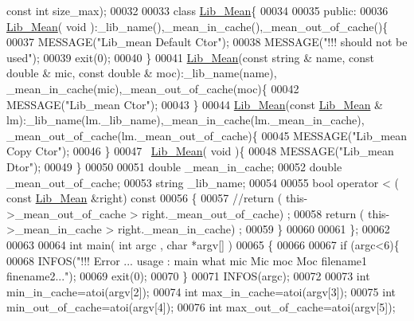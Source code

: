 \begin{DoxyCode}
{      const} \textcolor{keywordtype}{int} size\_max);
00032 
00033 \textcolor{keyword}{class }\hyperlink{class_lib___mean}{Lib\_Mean}\{
00034 
00035 \textcolor{keyword}{public}:
00036   \hyperlink{class_lib___mean}{Lib\_Mean}( \textcolor{keywordtype}{void} ):\_lib\_name(),\_mean\_in\_cache(),\_mean\_out\_of\_cache()\{
00037     MESSAGE(\textcolor{stringliteral}{"Lib\_mean Default Ctor"});
00038     MESSAGE(\textcolor{stringliteral}{"!!! should not be used"});
00039     exit(0);
00040   \}
00041   \hyperlink{class_lib___mean}{Lib\_Mean}(\textcolor{keyword}{const} \textcolor{keywordtype}{string} & name, \textcolor{keyword}{const} \textcolor{keywordtype}{double} & mic, \textcolor{keyword}{const} \textcolor{keywordtype}{double} & moc):\_lib\_name(name),
      \_mean\_in\_cache(mic),\_mean\_out\_of\_cache(moc)\{
00042     MESSAGE(\textcolor{stringliteral}{"Lib\_mean Ctor"});
00043   \}
00044   \hyperlink{class_lib___mean}{Lib\_Mean}(\textcolor{keyword}{const} \hyperlink{class_lib___mean}{Lib\_Mean} & lm):\_lib\_name(lm.\_lib\_name),\_mean\_in\_cache(lm.\_mean\_in\_cache),
      \_mean\_out\_of\_cache(lm.\_mean\_out\_of\_cache)\{
00045     MESSAGE(\textcolor{stringliteral}{"Lib\_mean Copy Ctor"});
00046   \}
00047   ~\hyperlink{class_lib___mean}{Lib\_Mean}( \textcolor{keywordtype}{void} )\{
00048     MESSAGE(\textcolor{stringliteral}{"Lib\_mean Dtor"});
00049   \}
00050     
00051   \textcolor{keywordtype}{double} \_mean\_in\_cache;
00052   \textcolor{keywordtype}{double} \_mean\_out\_of\_cache;
00053   \textcolor{keywordtype}{string} \_lib\_name;
00054 
00055   \textcolor{keywordtype}{bool} operator < ( \textcolor{keyword}{const} \hyperlink{class_lib___mean}{Lib\_Mean} &right)\textcolor{keyword}{ const }
00056 \textcolor{keyword}{  }\{
00057     \textcolor{comment}{//return ( this->\_mean\_out\_of\_cache > right.\_mean\_out\_of\_cache) ;}
00058     \textcolor{keywordflow}{return} ( this->\_mean\_in\_cache > right.\_mean\_in\_cache) ;
00059   \}
00060 
00061 \}; 
00062 
00063 
00064 \textcolor{keywordtype}{int} main( \textcolor{keywordtype}{int} argc , \textcolor{keywordtype}{char} *argv[] )
00065 \{
00066 
00067   \textcolor{keywordflow}{if} (argc<6)\{
00068     INFOS(\textcolor{stringliteral}{"!!! Error ... usage : main what mic Mic moc Moc filename1 finename2..."});
00069     exit(0);
00070   \}
00071   INFOS(argc);
00072 
00073   \textcolor{keywordtype}{int} min\_in\_cache=atoi(argv[2]);
00074   \textcolor{keywordtype}{int} max\_in\_cache=atoi(argv[3]);
00075   \textcolor{keywordtype}{int} min\_out\_of\_cache=atoi(argv[4]);
00076   \textcolor{keywordtype}{int} max\_out\_of\_cache=atoi(argv[5]);

\end{DoxyCode}
